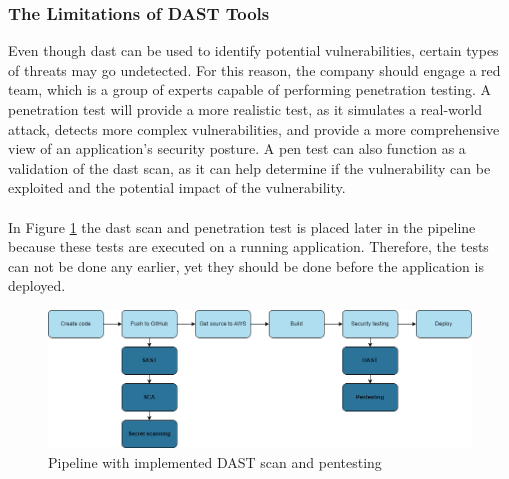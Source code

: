 \subsubsection{The Limitations of DAST Tools}
Even though \acrshort{dast} can be used to identify potential vulnerabilities, certain types of threats may go undetected. For this reason, the company should engage a red team, which is a group of experts capable of performing penetration testing. A penetration test will provide a more realistic test, as it simulates a real-world attack, detects more complex vulnerabilities, and provide a more comprehensive view of an application's security posture. A pen test can also function as a validation of the \acrshort{dast} scan, as it can help determine if the vulnerability can be exploited and the potential impact of the vulnerability. \cite{dastpentesting}
\\~\\
In Figure \ref{fig: Pipeline with implemented DAST scan and pentesting} the \acrshort{dast} scan and penetration test is placed later in the pipeline because these tests are executed on a running application. Therefore, the tests can not be done any earlier, yet they should be done before the application is deployed.
\vspace{2mm}
\begin{figure}[H]
    \centering
    \includegraphics[width=0.8\columnwidth]{Images/pipeline5.png}
    \caption{Pipeline with implemented DAST scan and pentesting}
    \label{fig: Pipeline with implemented DAST scan and pentesting}
\end{figure}